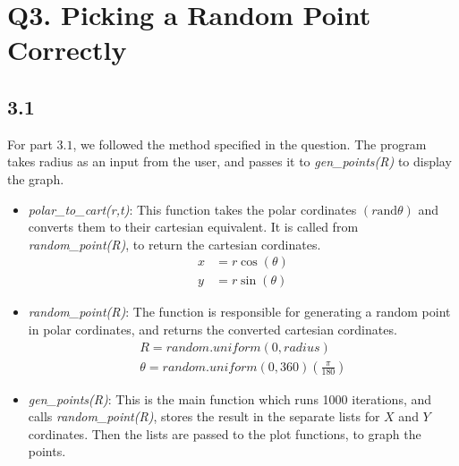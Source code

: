 \documentclass[answers]{exam}
\begin{document}



\section*{Q3. Picking a Random Point Correctly}

\subsection*{3.1}

\begin{framed}
  For part $3.1$, we followed the method specified in the question. The program takes radius as an input from the user, and passes it to \emph{gen\_points(R)} to display the graph.
  \begin{itemize}
    \item \emph{polar\_to\_cart(r,t)}: This function takes the polar cordinates $(r \text{and} \theta)$ and converts them to their cartesian equivalent. It is called from \emph{random\_point(R)}, to return the cartesian cordinates.\\
      \begin{align*}
        x &= r\cos(\theta)\\
        y &= r\sin(\theta)
      \end{align*}
    \item \emph{random\_point(R)}: The function is responsible for generating a random point in polar cordinates, and returns the converted cartesian cordinates.\\
      \begin{align*}
        R = random.uniform(0,radius)\\
        \theta = random.uniform(0,360)(\frac{\pi}{180})
      \end{align*}
    \item \emph{gen\_points(R)}: This is the main function which runs 1000 iterations, and calls \emph{random\_point(R)}, stores the result in the separate lists for $X$ and $Y$ cordinates. Then the lists are passed to the plot functions, to graph the points.

  \end{itemize}
\end{framed}


\end{document}
